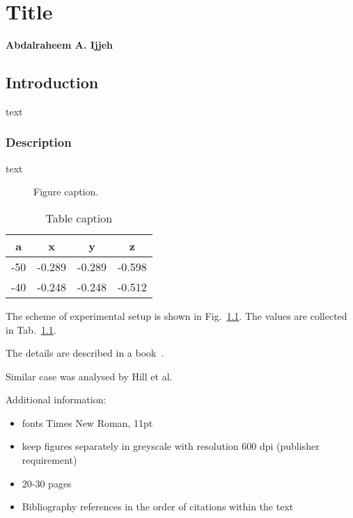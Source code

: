 \documentclass[b5paper, 11pt, openany, titlepage]{book}
\begin{document}

\chapter[Short title]{Title}

\textbf{Abdalraheem A. Ijjeh}

\newpage

\section{Introduction}
text
\subsection{Description}
text

\begin{figure} [h!]
	\begin{center}
	\end{center}
	\caption{Figure caption.} 
	\label{fig:bc}
\end{figure}

\begin{table}[h]
\centering
	\caption{Table caption}
	\begin{tabular}{cccc}
		\hline
	\textbf{a}	& \textbf{x} & \textbf{y} & \textbf{z} \\
		\hline
		-50 & -0.289 & -0.289 & -0.598\\ 
		-40 & -0.248 & -0.248 & -0.512\\ 
		\hline 
	\end{tabular} 
	\label{tab:xyz}
\end{table}

The scheme of experimental setup is shown in Fig.~\ref{fig:bc}.  
The values are collected in Tab.~\ref{tab:xyz}.


The details are described in a book~\cite{udd2011fiber}. 

Similar case was analysed by Hill et al.~\cite{hill1978photosensitivity}

Additional information:
\begin{itemize}
\item fonts Times New Roman, 11pt
\item keep figures separately in greyscale with resolution 600 dpi (publisher requirement)
\item 20-30 pages
\item Bibliography references in the order of citations within the text
\end{itemize}


 
 


\end{document}
